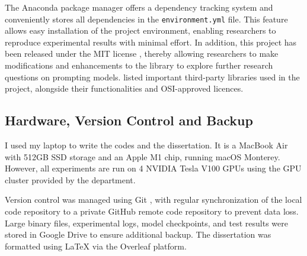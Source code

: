 The Anaconda \cite{anaconda20pack} package manager offers a dependency tracking system and conveniently stores all dependencies in the \texttt{environment.yml} file. This feature allows easy installation of the project environment, enabling researchers to reproduce experimental results with minimal effort. In addition, this project has been released under the MIT license \cite{MITLicense}, thereby allowing researchers to make modifications and enhancements to the library to explore further research questions on prompting models.  listed important third-party libraries used in the project, alongside their functionalities and OSI-approved \cite{OSI} licences.


\vspace{-1.2em}
\subsection{Hardware, Version Control and Backup}
I used my laptop to write the codes and the dissertation. It is a MacBook Air with 512GB SSD storage and an Apple M1 chip, running macOS Monterey. However, all experiments are run on 4 NVIDIA Tesla V100 GPUs using the GPU cluster provided by the department.

Version control was managed using Git \cite{wilson06git}, with regular synchronization of the local code repository to a private GitHub remote code repository to prevent data loss. Large binary files, experimental logs, model checkpoints, and test results were stored in Google Drive to ensure additional backup. The dissertation was formatted using LaTeX via the Overleaf platform.
